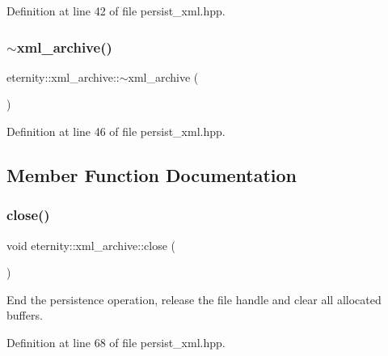 Definition at line 42 of file persist\+\_\+xml.\+hpp.

\mbox{\label{classeternity_1_1xml__archive_aed17710a8c15f35f9296d8805299f619}} 
\subsubsection{\texorpdfstring{$\sim$xml\+\_\+archive()}{~xml\_archive()}}
{\footnotesize\ttfamily eternity\+::xml\+\_\+archive\+::$\sim$xml\+\_\+archive (\begin{DoxyParamCaption}{ }\end{DoxyParamCaption})\hspace{0.3cm}{\ttfamily [inline]}}



Definition at line 46 of file persist\+\_\+xml.\+hpp.



\subsection{Member Function Documentation}
\mbox{\label{classeternity_1_1xml__archive_a9f27feeac62aa0c3370ef9bcc60d86c6}} 
\subsubsection{\texorpdfstring{close()}{close()}}
{\footnotesize\ttfamily void eternity\+::xml\+\_\+archive\+::close (\begin{DoxyParamCaption}{ }\end{DoxyParamCaption})\hspace{0.3cm}{\ttfamily [inline]}}

End the persistence operation, release the file handle and clear all allocated buffers. 

Definition at line 68 of file persist\+\_\+xml.\+hpp.

\mbox{\label{classeternity_1_1xml__archive_a946e60b3bd83fc8cf65d740b4ebf63e0}} 
